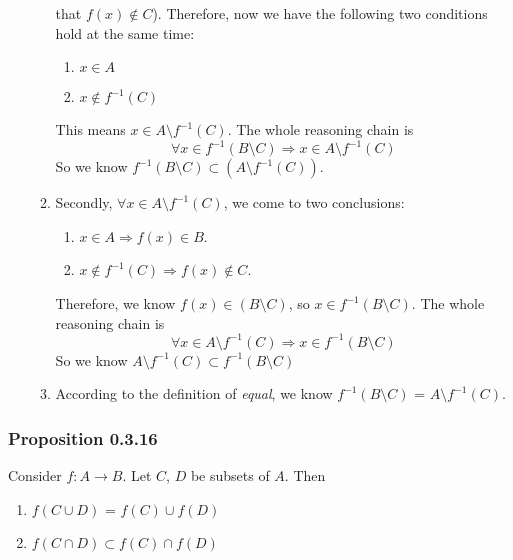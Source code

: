 \documentclass[12pt, letterpaper, oneside]{book}
\begin{document}
\begin{enumerate}
\begin{enumerate}
                that $f(x) \notin C$). Therefore, now we have the following two
                conditions hold at the same time:
                \begin{enumerate}
                  \item $x \in A$
                  \item $x \notin f^{-1}(C)$
                \end{enumerate}
                This means $x \in A \setminus f^{-1}(C)$. The whole reasoning chain is
                \[
                  \forall x \in f^{-1}(B \setminus C) \Rightarrow x \in A \setminus
                  f^{-1}(C)
                \]
                So we know $f^{-1}(B \setminus C) \subset (A \setminus f^{-1}(C))$.
          \item Secondly, $\forall x \in A \setminus f^{-1}(C)$, we come to two
                conclusions:
                \begin{enumerate}
                  \item $x \in A \Rightarrow f(x) \in B$.
                  \item $x \notin f^{-1}(C) \Rightarrow f(x) \notin C$.
                \end{enumerate}
                Therefore, we know $f(x) \in (B \setminus C)$, so $x \in f^{-1}(B
                  \setminus C)$. The whole
                reasoning chain is
                \[
                  \forall x \in A \setminus f^{-1}(C) \Rightarrow x \in f^{-1}(B
                  \setminus C)
                \]
                So we know $A \setminus f^{-1}(C) \subset f^{-1}(B \setminus C)$
          \item According to the definition of \textit{equal}, we know $f^{-1}(B
                  \setminus C)$ = $A \setminus f^{-1}(C)$.
        \end{enumerate}
\end{enumerate}

\subsubsection{Proposition 0.3.16}

Consider $f: A \rightarrow B$. Let $C$, $D$ be subsets of $A$. Then
\begin{enumerate}
  \item $f(C \cup D)$ = $f(C) \cup f(D)$
  \item $f(C \cap D) \subset f(C) \cap f(D)$
\end{enumerate}
\end{document}
